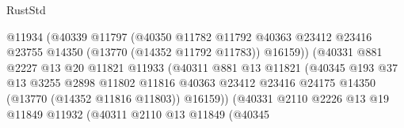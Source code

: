 \begin{lexlean}{RustStd}
\begin{coremodule}
                                        @11934
                                        (@40339
                                          @11797
                                          (@40350
                                            @11782
                                            @11792
                                            @40363
                                            @23412
                                            @23416
                                            @23755
                                            @14350
                                            (@13770 (@14352 @11792 @11783))
                                            @16159))
                                        (@40331
                                          @881
                                          @2227
                                          @13
                                          @20
                                          @11821
                                          @11933
                                          (@40311
                                            @881
                                            @13
                                            @11821
                                            (@40345
                                              @193
                                              @37
                                              @13
                                              @3255
                                              @2898
                                              @11802
                                              @11816
                                              @40363
                                              @23412
                                              @23416
                                              @24175
                                              @14350
                                              (@13770 (@14352 @11816 @11803))
                                              @16159))
                                          (@40331
                                            @2110
                                            @2226
                                            @13
                                            @19
                                            @11849
                                            @11932
                                            (@40311
                                              @2110
                                              @13
                                              @11849
                                              (@40345

\end{coremodule}
\end{lexlean}
